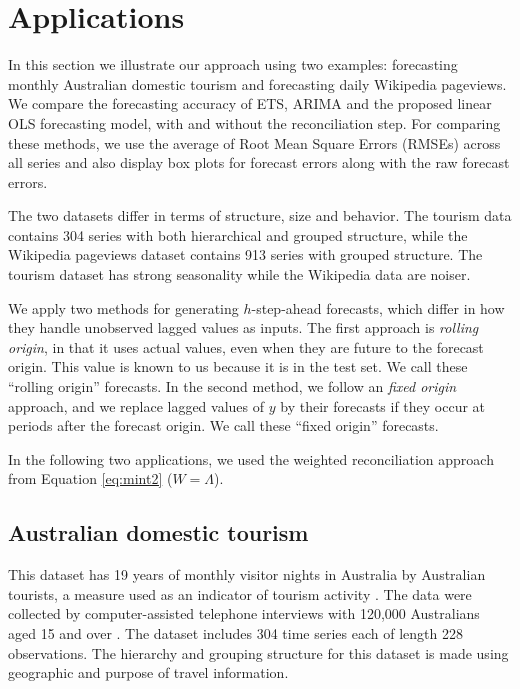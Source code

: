 \documentclass[11pt,a4paper,]{article}
\begin{document}
\hypertarget{applications}{%
\section{Applications}\label{applications}}

In this section we illustrate our approach using two examples:
forecasting monthly Australian domestic tourism and forecasting daily
Wikipedia pageviews. We compare the forecasting accuracy of ETS, ARIMA
and the proposed linear OLS forecasting model, with and without the
reconciliation step. For comparing these methods, we use the average of
Root Mean Square Errors (RMSEs) across all series and also display box
plots for forecast errors along with the raw forecast errors.

The two datasets differ in terms of structure, size and behavior. The
tourism data contains 304 series with both hierarchical and grouped
structure, while the Wikipedia pageviews dataset contains 913 series
with grouped structure. The tourism dataset has strong seasonality while
the Wikipedia data are noiser.

We apply two methods for generating \(h\)-step-ahead forecasts, which
differ in how they handle unobserved lagged values as inputs. The first
approach is \emph{rolling origin}, in that it uses actual values, even
when they are future to the forecast origin. This value is known to us
because it is in the test set. We call these ``rolling origin''
forecasts. In the second method, we follow an \emph{fixed origin}
approach, and we replace lagged values of \(y\) by their forecasts if
they occur at periods after the forecast origin. We call these ``fixed
origin'' forecasts.

In the following two applications, we used the weighted reconciliation
approach from Equation \eqref{eq:mint2} (\(W=\Lambda\)).

\hypertarget{australian-domestic-tourism}{%
\subsection{Australian domestic
tourism}\label{australian-domestic-tourism}}

This dataset has 19 years of monthly visitor nights in Australia by
Australian tourists, a measure used as an indicator of tourism activity
\autocite{mint2018}. The data were collected by computer-assisted
telephone interviews with 120,000 Australians aged 15 and over
\autocite{researchAustralia2005}. The dataset includes 304 time series
each of length 228 observations. The hierarchy and grouping structure
for this dataset is made using geographic and purpose of travel
information.
\end{document}
